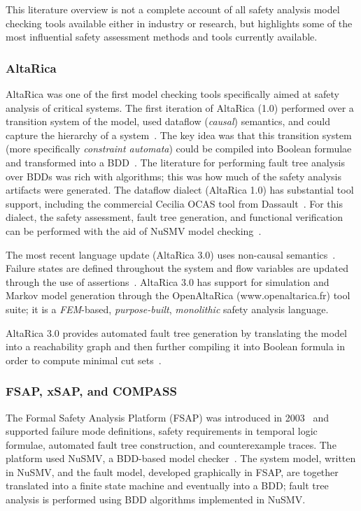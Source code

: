 This literature overview is not a complete account of all safety analysis model checking tools available either in industry or research, but highlights some of the most influential safety assessment methods and tools currently available. 

\subsubsection{AltaRica}
AltaRica was one of the first model checking tools specifically aimed at safety analysis of critical systems. The first iteration of AltaRica (1.0) performed over a transition system of the model, used dataflow ({\em causal}) semantics, and could capture the hierarchy of a system~\cite{signoret1998altarica}. The key idea was that this transition system (more specifically {\em constraint automata}) could be compiled into Boolean formulae and transformed into a BDD~\cite{point1999altarica}. The literature for performing fault tree analysis over BDDs was rich with algorithms; this was how much of the safety analysis artifacts were generated. The dataflow dialect (AltaRica 1.0) has substantial tool support, including the commercial Cecilia OCAS tool from Dassault~\cite{bieber2004safety}. For this dialect, the safety assessment, fault tree generation, and functional verification can be performed with the aid of NuSMV model checking~\cite{symbAltaRica}.

The most recent language update (AltaRica 3.0) uses non-causal semantics~\cite{prosvirnova2013compilationfaulttrees,PROSVIRNOVA2013127}. Failure states are defined throughout the system and flow variables are updated through the use of assertions~\cite{Bieber04safetyassessment}.  AltaRica 3.0 has support for simulation and Markov model generation through the OpenAltaRica (www.openaltarica.fr) tool suite; it is a {\em FEM}-based, {\em purpose-built}, {\em monolithic} safety analysis language. 

AltaRica 3.0 provides automated fault tree generation by translating the model into a reachability graph and then further compiling it into Boolean formula in order to compute minimal cut sets~\cite{prosvirnova2015automated}. 

\subsubsection{FSAP, xSAP, and COMPASS}
The Formal Safety Analysis Platform (FSAP) was introduced in 2003~\cite{bozzano2003improving} and supported failure mode definitions, safety requirements in temporal logic formulae, automated fault tree construction, and counterexample traces. The platform used NuSMV, a BDD-based model checker~\cite{Cimatti2000}. The system model, written in NuSMV, and the fault model, developed graphically in FSAP, are together translated into a finite state machine and eventually into a BDD; fault tree analysis is performed using BDD algorithms implemented in NuSMV. 

